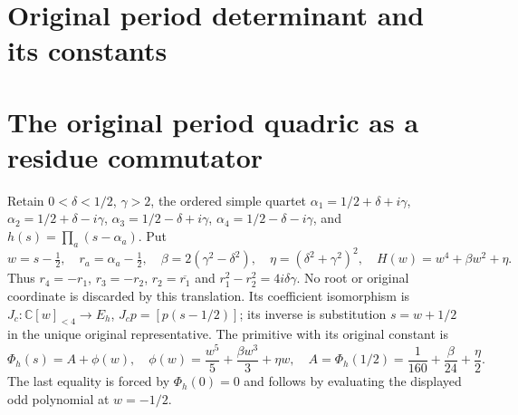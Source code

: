 \documentclass[11pt,a4paper]{article}
\begin{document}
\label{pcl:MPBUILD:RMR_PERIOD_RECEIVER:end}


\clearpage

\endgroup

\clearpage
\begingroup


\setcounter{equation}{0}
\renewcommand{\theequation}{RPC.\arabic{equation}}
\section*{Original period determinant and its constants}
\section{The original period quadric as a residue commutator}
\label{rpc:sec:actual-period-residue-commutator}

Retain $0<\delta<1/2$, $\gamma>2$, the ordered simple quartet
$\alpha_1=1/2+\delta+i\gamma$, $\alpha_2=1/2+\delta-i\gamma$,
$\alpha_3=1/2-\delta+i\gamma$, $\alpha_4=1/2-\delta-i\gamma$,
and $h(s)=\prod_a(s-\alpha_a)$. Put
\[
 w=s-\tfrac12,\quad r_a=\alpha_a-\tfrac12,\quad
 \beta=2(\gamma^2-\delta^2),\quad \eta=(\delta^2+\gamma^2)^2,
 \quad H(w)=w^4+\beta w^2+\eta.
 \tag{RPC1}
\]
Thus $r_4=-r_1$, $r_3=-r_2$, $r_2=\overline{r_1}$ and
$r_1^2-r_2^2=4i\delta\gamma$. No root or original coordinate is
discarded by this translation. Its coefficient isomorphism is
$J_c:\mathbb C[w]_{<4}\to E_h$, $J_cp=[p(s-1/2)]$; its inverse
is substitution $s=w+1/2$ in the unique original representative.
The primitive with its original constant is
\[
 \Phi_h(s)=A+\phi(w),\quad
 \phi(w)=\frac{w^5}{5}+\frac{\beta w^3}{3}+\eta w,\quad
 A=\Phi_h(1/2)=\frac1{160}+\frac\beta{24}+\frac\eta2.
 \tag{RPC2}
\]
The last equality is forced by $\Phi_h(0)=0$ and follows by evaluating
the displayed odd polynomial at $w=-1/2$.
\end{document}
